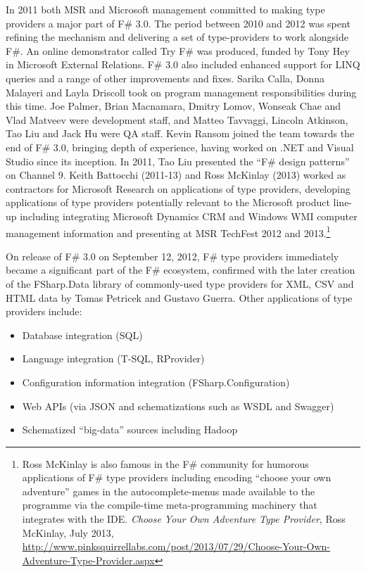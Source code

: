 \documentclass[acmsmall]{acmart}\settopmatter{}
\begin{document}
In 2011 both MSR and Microsoft management committed to making type providers a major part of F\# 3.0. The period
between 2010 and 2012 was spent refining the mechanism and delivering a set of type-providers to work alongside F\#.
An online demonstrator called Try F\# was produced, funded by Tony Hey in Microsoft External Relations. F\# 3.0 also
included enhanced support for LINQ queries and a range of other improvements and fixes. Sarika Calla, Donna Malayeri
and Layla Driscoll took on program management responsibilities during this time.  Joe Palmer, Brian Macnamara, Dmitry
Lomov, Wonseak Chae and Vlad Matveev were development staff, and Matteo Tavvaggi, Lincoln Atkinson, Tao Liu and
Jack Hu were QA staff. Kevin Ransom joined the team towards the end of F\# 3.0, bringing depth of experience, having
worked on .NET and Visual Studio since its inception. In 2011, Tao Liu presented the “F\# design patterns” on Channel 9.
Keith Battocchi (2011-13) and Ross McKinlay (2013) worked as contractors for Microsoft Research on applications of type
providers, developing applications of type providers potentially relevant to the Microsoft product line-up including integrating
Microsoft Dynamics CRM and Windows WMI computer management information and presenting at MSR TechFest 2012 and
2013.\footnote{ Ross McKinlay is also famous in the F\# community for humorous applications of F\# type providers
including encoding “choose your own adventure” games in the autocomplete-menus made available to the programme
via the compile-time meta-programming machinery that integrates with the IDE. \textit{Choose Your Own Adventure
Type Provider}, Ross McKinlay, July 2013, \url{http://www.pinksquirrellabs.com/post/2013/07/29/Choose-Your-Own-Adventure-Type-Provider.aspx}}

On release of F\# 3.0 on September 12, 2012,  F\# type providers immediately became a significant part of the F\# ecosystem, confirmed with the later creation of the FSharp.Data library of commonly-used type providers for XML, CSV and HTML data by Tomas Petricek and Gustavo Guerra.  Other applications of type providers include:

\begin{itemize}
\item Database integration (SQL)
\item Language integration (T-SQL, RProvider)
\item Configuration information integration (FSharp.Configuration)
\item Web APIs (via JSON and schematizations such as WSDL and Swagger)
\item Schematized “big-data” sources including Hadoop
\end{itemize}
\end{document}
